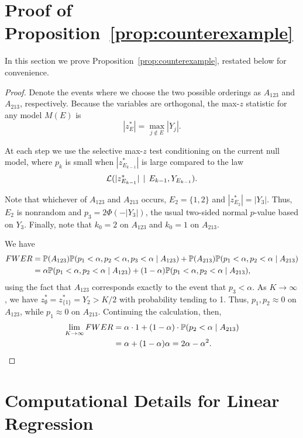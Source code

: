 \documentclass{article}
\begin{document}
\begin{appendix}

\section{Proof of Proposition~\ref{prop:counterexample}}

In this section we prove Proposition~\ref{prop:counterexample}, restated below for convenience.

\counterex*

\begin{proof}
Denote the events where we choose the two possible orderings as $A_{123}$ and $A_{213}$, respectively. Because the variables are orthogonal, the max-$z$ statistic for any model $M(E)$ is 
\[
|z_E^*|=\max_{j\notin E} |Y_j|.
\]

At each step we use the selective max-$z$ test conditioning on the current null model, where $p_k$ is small when $|z_{E_{k-1}}^*|$ is large compared to the law
\[
\L(|z_{E_{k-1}}^*| \,\mid\, E_{k-1}, Y_{E_{k-1}}).
\]

Note that whichever of $A_{123}$ and $A_{213}$ occurs, $E_2=\{1,2\}$ and $|z_{E_2}^*|=|Y_3|$. Thus, $E_2$ is nonrandom and $p_3=2\Phi(-|Y_3|)$, the usual two-sided normal $p$-value based on $Y_3$. Finally, note that $k_0=2$ on $A_{123}$ and $k_0=1$ on $A_{213}$. 

We have
\begin{align*}
  FWER 
  &= \P(A_{123})\P(p_1<\alpha, p_2<\alpha, p_3<\alpha \mid A_{123})
  + \P(A_{213})\P(p_1<\alpha, p_2<\alpha \mid A_{213})\\
  &= \alpha \P(p_1<\alpha, p_2<\alpha \mid A_{123})
  + (1-\alpha) \P(p_1<\alpha, p_2<\alpha \mid A_{213}),
\end{align*}
using the fact that $A_{123}$ corresponds exactly to the event that $p_3<\alpha$. As $K\to\infty$, we have $z_\emptyset^*=z_{\{1\}}^*=Y_2>K/2$ with probability tending to 1. Thus, $p_1,p_2\approx 0$ on $A_{123}$, while $p_1\approx 0$ on $A_{213}$. Continuing the calculation, then,
\begin{align*}
  \lim_{K\to\infty} FWER 
  &= \alpha\cdot 1 + (1-\alpha)\cdot \P(p_2 < \alpha \mid A_{213})\\
  &= \alpha + (1-\alpha)\alpha = 2\alpha-\alpha^2.
\end{align*}
\end{proof}


\section{Computational Details for Linear Regression}\label{sec:linRegComputation}


\end{appendix}
\end{document}
